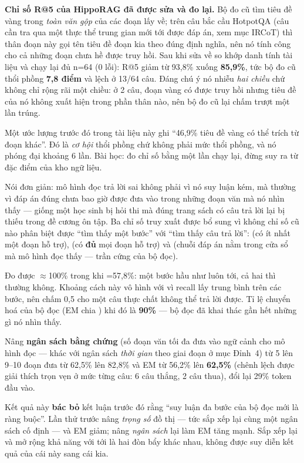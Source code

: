 \textbf{Chỉ số R@5 của HippoRAG đã được sửa và đo lại.} Bộ đo cũ tìm tiêu đề vàng
trong \emph{toàn văn gộp} của các đoạn lấy về; trên câu bắc cầu HotpotQA (câu cần tra qua
một thực thể trung gian mới tới được đáp án, xem mục IRCoT) thì thân
đoạn này gọi tên tiêu đề đoạn kia theo đúng định nghĩa, nên nó tính công cho cả
những đoạn chưa hề được truy hồi. Sau khi sửa về so khớp danh tính tài liệu và
chạy lại đủ n=64 (0 lỗi): R@5 giảm từ 93,8\% xuống \textbf{85,9\%}, tức bộ đo cũ
thổi phồng \textbf{7,8 điểm} và lệch ở 13/64 câu. Đáng chú ý nó nhiễu \emph{hai
chiều} chứ không chỉ rộng rãi một chiều: ở 2 câu, đoạn vàng có được truy hồi
nhưng tiêu đề của nó không xuất hiện trong phần thân nào, nên bộ đo cũ lại chấm
trượt một lần trúng.

Một ước lượng trước đó trong tài liệu này ghi ``46,9\% tiêu đề vàng có thể trích
từ đoạn khác''. Đó là \emph{cơ hội} thổi phồng chứ không phải mức thổi phồng, và
nó phóng đại khoảng 6 lần. Bài học: đo chỉ số bằng một lần chạy lại, đừng suy ra
từ đặc điểm của kho ngữ liệu.

\begin{luuy}
Nói đơn giản: mô hình đọc trả lời sai không phải vì nó suy luận kém, mà thường vì đáp án
đúng chưa bao giờ được đưa vào trong những đoạn văn mà nó nhìn thấy — giống một học sinh bị
hỏi thi mà đúng trang sách có câu trả lời lại bị thiếu trong đề cương ôn tập. Ba chỉ số
truy xuất được bổ sung vì không chỉ số cũ nào phân biệt được ``tìm thấy
một bước'' với ``tìm thấy câu trả lời'':  (có ít nhất một đoạn hỗ trợ),
 (có \textbf{đủ} mọi đoạn hỗ trợ) và 
(chuỗi đáp án nằm trong cửa sổ mà mô hình đọc thấy --- trần cứng của bộ đọc).

Đo được $\approx$100\% trong khi =57,8\%: một bước
hầu như luôn tới, cả hai thì thường không. Khoảng cách này vô hình với
 vì recall lấy trung bình trên các bước, nên chấm 0,5 cho một câu
thực chất không thể trả lời được. Tỉ lệ chuyển hoá của bộ đọc
(EM chia ) khi đó là \textbf{90\%} --- bộ đọc đã khai thác
gần hết những gì nó nhìn thấy.

Nâng \textbf{ngân sách bằng chứng} (số đoạn văn tối đa đưa vào ngữ cảnh cho mô hình đọc —
khác với ngân sách \textit{thời gian} theo giai đoạn ở mục Đỉnh~4) từ 5 lên 9--10 đoạn đưa
 từ 62,5\% lên 82,8\% và EM từ 56,2\% lên \textbf{62,5\%} (chênh
lệch được giải thích
trọn vẹn ở mức từng câu: 6 câu thắng, 2 câu thua), đổi lại 29\% token đầu vào.

Kết quả này \textbf{bác bỏ} kết luận trước đó rằng ``suy luận đa bước của bộ đọc mới
là ràng buộc''. Lần thử trước nâng \emph{trọng số} đồ thị --- tức sắp xếp lại cùng
một ngân sách cố định --- và EM giảm; nâng \emph{ngân sách} lại làm EM tăng mạnh.
Sắp xếp lại và mở rộng khả năng với tới là hai đòn bẩy khác nhau, không được suy
diễn kết quả của cái này sang cái kia.
\end{luuy}

